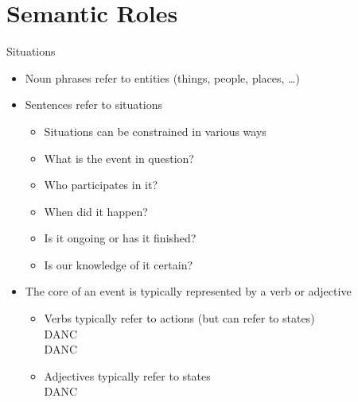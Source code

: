 \section{Semantic Roles}


\begin{frame}{Situations}

\begin{itemize}
\item Noun phrases refer to entities (things, people, places, \ldots) 
\item Sentences refer to situations
  \begin{itemize}
  \item Situations can be constrained in various ways
  \item What is the event in question?
  \item Who participates in it?
  \item When did it happen?
  \item Is it ongoing or has it finished?
  \item Is our knowledge of it certain?
  \end{itemize}
\item The core of an event is typically represented by a verb or
  adjective 
  \begin{itemize}
  \item Verbs typically refer to actions (but can refer to states)
    \\  DANC
    \\   DANC
  \item Adjectives typically refer to states
    \\  DANC
  \end{itemize}
\end{itemize}

\end{frame}
